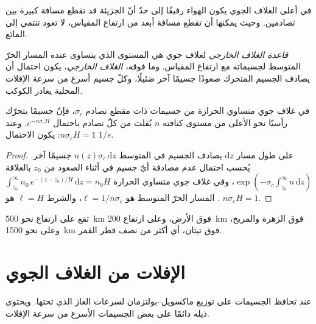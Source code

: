 في أعلى الغلاف الجوي يكون الهواء رقيقًا إلى حدّ أنّ الجزيئة قد تقطع مسافة كبيرة
بين تصادمين. وحيث يمكنها أن تقطع مسافة أبعد من ارتفاع المقياس، لا
تعود تنتمي إلى المائع.

\begin{definition}\label{def:b3:planetary-atmospheres:exobase}
\emph{قاعدة الغلاف الخارجي} لغلاف جوي هي المستوى الذي
يتساوى عنده المسار الحرّ المتوسط لجسيماته مع ارتفاع المقياس. وما فوقه،
\emph{الغلاف الخارجي}، يكون احتمال أن يصادف الجسيم المتحرك صعودًا جسيمًا آخر ضئيلًا،
وكلّ جسيم أسرع من سرعة الإفلات المحلية
يغادر الكوكب.
\end{definition}

\begin{proposition}\label{prop:b3:planetary-atmospheres:exobase}
في غلاف جوي متساوي الحرارة من جسيمات ذات مقطع تصادم
$\sigma_c$، فإنّ جسيمًا يتحرّك رأسيًا نحو الأعلى من مستوى كثافته
$n$ يُفلت من كلّ تصادم باحتمال $e^{-n\sigma_c H}$. وعند
 $n\sigma_c H = 1$: يكون الاحتمال $1/e$.
\end{proposition}

\begin{proof}
على طول مسار $\mathrm dz$ يصادف الجسيم في المتوسط $n(z)\sigma_c\,
\mathrm dz$ جسيمًا آخر. يُحسب احتمال عدم مصادفة أيّ جسيم في أثناء الصعود من
$z_0$ بالعلاقة $\exp(-\sigma_c\int_{z_0}^\infty n\,\mathrm dz)$، وفي
غلاف جوي متساوي الحرارة $\int_{z_0}^\infty n_0\,e^{-(z-z_0)/H}\,\mathrm dz
= n_0 H$. المسار الحرّ المتوسط هو $\ell = 1/n\sigma_c$، والشرط $\ell
= H$ هو $n\sigma_c H = 1$.
\end{proof}

تقع  على ارتفاع نحو \qty{500}{km} فوق الأرض، وعلى ارتفاع \qty{200}{km} فوق
الزهرة والمريخ، وعلى نحو \qty{1500}{km} فوق تيتان، أي أكثر من نصف
قطر القمر.

\section{الإفلات من الغلاف الجوي}\label{sec:b3:planetary-atmospheres:escape}

عند  تحافظ الجسيمات على توزيع ماكسويل--بولتزمان لسرعات الغاز
الذي تحتها. ويحتوي ذيله دائمًا على بعض الجسيمات الأسرع من
سرعة الإفلات.

